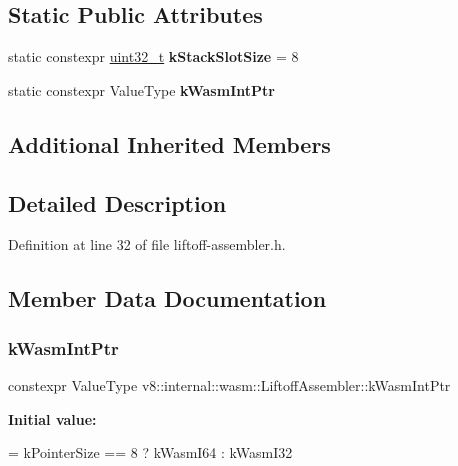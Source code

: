 \subsection*{Static Public Attributes}
\begin{DoxyCompactItemize}
\item 
\mbox{\label{classv8_1_1internal_1_1wasm_1_1LiftoffAssembler_a2a243de756425e668b40a29d78fc75e2}} 
static constexpr \mbox{\hyperlink{classuint32__t}{uint32\+\_\+t}} {\bfseries k\+Stack\+Slot\+Size} = 8
\item 
static constexpr Value\+Type {\bfseries k\+Wasm\+Int\+Ptr}
\end{DoxyCompactItemize}
\subsection*{Additional Inherited Members}


\subsection{Detailed Description}


Definition at line 32 of file liftoff-\/assembler.\+h.



\subsection{Member Data Documentation}
\mbox{\label{classv8_1_1internal_1_1wasm_1_1LiftoffAssembler_aa18d5bd9d51c17ab3c118c32a374a89f}} 
\subsubsection{\texorpdfstring{k\+Wasm\+Int\+Ptr}{kWasmIntPtr}}
{\footnotesize\ttfamily constexpr Value\+Type v8\+::internal\+::wasm\+::\+Liftoff\+Assembler\+::k\+Wasm\+Int\+Ptr\hspace{0.3cm}{\ttfamily [static]}}

{\bfseries Initial value\+:}
\begin{DoxyCode}
=
      kPointerSize == 8 ? kWasmI64 : kWasmI32
\end{DoxyCode}


